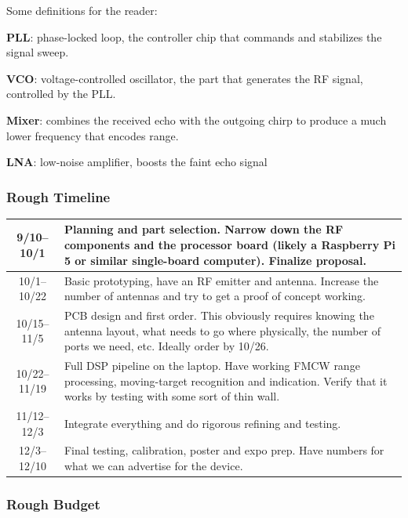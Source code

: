 \documentclass[11pt]{article}
\begin{document}
Some definitions for the reader:

\textbf{PLL}: phase-locked loop, the controller chip that commands and stabilizes the signal sweep.

\textbf{VCO}: voltage-controlled oscillator, the part that generates the RF signal, controlled by the PLL.

\textbf{Mixer}: combines the received echo with the outgoing chirp to produce a much lower frequency that encodes range.

\textbf{LNA}: low-noise amplifier, boosts the faint echo signal

\subsubsection*{Rough Timeline}

\begin{center}
\small
\begin{tabular}{|c|p{13.5cm}|}
\hline
9/10--10/1 & Planning and part selection. Narrow down the RF components and the processor board (likely a Raspberry Pi 5 or similar single-board computer). Finalize proposal. \\
\hline
10/1--10/22 & Basic prototyping, have an RF emitter and antenna. Increase the number of antennas and try to get a proof of concept working.  \\
\hline
10/15--11/5 & PCB design and first order. This obviously requires knowing the antenna layout, what needs to go where physically, the number of ports we need, etc. Ideally order by 10/26. \\
\hline
10/22--11/19 & Full DSP pipeline on the laptop. Have working FMCW range processing, moving-target recognition and indication. Verify that it works by testing with some sort of thin wall. \\
\hline
11/12--12/3 & Integrate everything and do rigorous refining and testing. \\
\hline
12/3--12/10 & Final testing, calibration, poster and expo prep. Have numbers for what we can advertise for the device. \\
\hline
\end{tabular}
\end{center}

\subsubsection*{Rough Budget}
\end{document}
